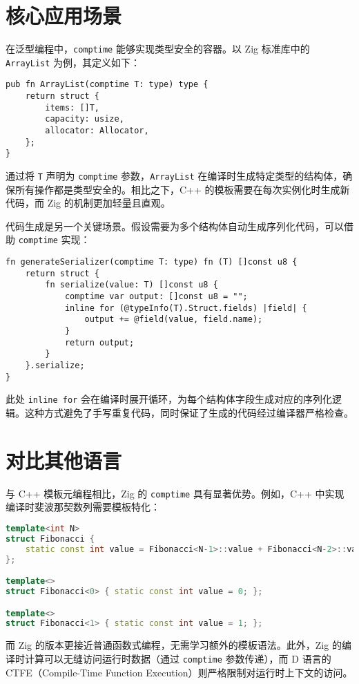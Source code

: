 \chapter{核心应用场景}
在泛型编程中，\verb!comptime! 能够实现类型安全的容器。以 Zig 标准库中的 \verb!ArrayList! 为例，其定义如下：\par
\begin{lstlisting}[language=zig]
pub fn ArrayList(comptime T: type) type {
    return struct {
        items: []T,
        capacity: usize,
        allocator: Allocator,
    };
}
\end{lstlisting}
通过将 \verb!T! 声明为 \verb!comptime! 参数，\verb!ArrayList! 在编译时生成特定类型的结构体，确保所有操作都是类型安全的。相比之下，C++ 的模板需要在每次实例化时生成新代码，而 Zig 的机制更加轻量且直观。\par
代码生成是另一个关键场景。假设需要为多个结构体自动生成序列化代码，可以借助 \verb!comptime! 实现：\par
\begin{lstlisting}[language=zig]
fn generateSerializer(comptime T: type) fn (T) []const u8 {
    return struct {
        fn serialize(value: T) []const u8 {
            comptime var output: []const u8 = "";
            inline for (@typeInfo(T).Struct.fields) |field| {
                output += @field(value, field.name);
            }
            return output;
        }
    }.serialize;
}
\end{lstlisting}
此处 \verb!inline for! 会在编译时展开循环，为每个结构体字段生成对应的序列化逻辑。这种方式避免了手写重复代码，同时保证了生成的代码经过编译器严格检查。\par
\chapter{对比其他语言}
与 C++ 模板元编程相比，Zig 的 \verb!comptime! 具有显著优势。例如，C++ 中实现编译时斐波那契数列需要模板特化：\par
\begin{lstlisting}[language=cpp]
template<int N>
struct Fibonacci {
    static const int value = Fibonacci<N-1>::value + Fibonacci<N-2>::value;
};

template<>
struct Fibonacci<0> { static const int value = 0; };

template<>
struct Fibonacci<1> { static const int value = 1; };
\end{lstlisting}
而 Zig 的版本更接近普通函数式编程，无需学习额外的模板语法。此外，Zig 的编译时计算可以无缝访问运行时数据（通过 \verb!comptime! 参数传递），而 D 语言的 CTFE（Compile-Time Function Execution）则严格限制对运行时上下文的访问。\par
